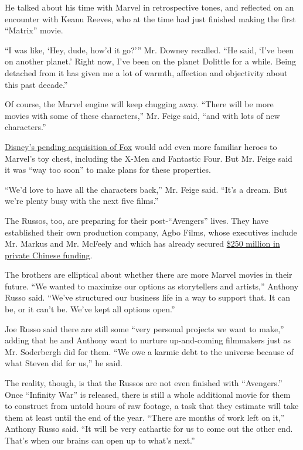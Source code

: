 He talked about his time with Marvel in retrospective tones, and
reflected on an encounter with Keanu Reeves, who at the time had just
finished making the first ``Matrix'' movie.

``I was like, `Hey, dude, how'd it go?''' Mr. Downey recalled. ``He
said, `I've been on another planet.' Right now, I've been on the planet
Dolittle for a while. Being detached from it has given me a lot of
warmth, affection and objectivity about this past decade.''

Of course, the Marvel engine will keep chugging away. ``There will be
more movies with some of these characters,'' Mr. Feige said, ``and with
lots of new characters.''

\href{https://www.nytimes3xbfgragh.onion/2017/12/14/business/dealbook/disney-fox-deal.html}{Disney's
pending acquisition of Fox} would add even more familiar heroes to
Marvel's toy chest, including the X-Men and Fantastic Four. But Mr.
Feige said it was ``way too soon'' to make plans for these properties.

``We'd love to have all the characters back,'' Mr. Feige said. ``It's a
dream. But we're plenty busy with the next five films.''

The Russos, too, are preparing for their post-``Avengers'' lives. They
have established their own production company, Agbo Films, whose
executives include Mr. Markus and Mr. McFeely and which has already
secured
\href{https://www.wsj.com/articles/hollywoods-latest-power-brothers-hunt-for-the-next-china-backed-blockbuster-1520852400}{\$250
million in private Chinese funding}.

The brothers are elliptical about whether there are more Marvel movies
in their future. ``We wanted to maximize our options as storytellers and
artists,'' Anthony Russo said. ``We've structured our business life in a
way to support that. It can be, or it can't be. We've kept all options
open.''

Joe Russo said there are still some ``very personal projects we want to
make,'' adding that he and Anthony want to nurture up-and-coming
filmmakers just as Mr. Soderbergh did for them. ``We owe a karmic debt
to the universe because of what Steven did for us,'' he said.

The reality, though, is that the Russos are not even finished with
``Avengers.'' Once ``Infinity War'' is released, there is still a whole
additional movie for them to construct from untold hours of raw footage,
a task that they estimate will take them at least until the end of the
year. ``There are months of work left on it,'' Anthony Russo said. ``It
will be very cathartic for us to come out the other end. That's when our
brains can open up to what's next.''

